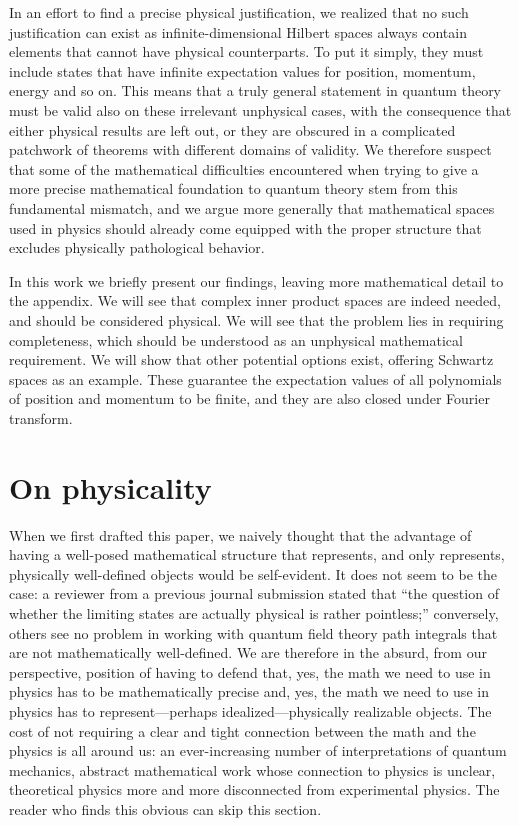 \documentclass[10pt,twocolumn, nofootinbib]{revtex4-2}
\begin{document}
In an effort to find a precise physical justification, we realized that no such justification can exist as infinite-dimensional Hilbert spaces always contain elements that cannot have physical counterparts. To put it simply, they must include states that have infinite expectation values for position, momentum, energy and so on. This means that a truly general statement in quantum theory must be valid also on these irrelevant unphysical cases, with the consequence that either physical results are left out, or they are obscured in a complicated patchwork of theorems with different domains of validity. We therefore suspect that some of the mathematical difficulties encountered when trying to give a more precise mathematical foundation to quantum theory stem from this fundamental mismatch, and we argue more generally that mathematical spaces used in physics should already come equipped with the proper structure that excludes physically pathological behavior.

In this work we briefly present our findings, leaving more mathematical detail to the appendix. We will see that complex inner product spaces are indeed needed, and should be considered physical. We will see that the problem lies in requiring completeness, which should be understood as an unphysical mathematical requirement. We will show that other potential options exist, offering Schwartz spaces as an example. These guarantee the expectation values of all polynomials of position and momentum to be finite, and they are also closed under Fourier transform.

\section{On physicality}

When we first drafted this paper, we naively thought that the advantage of having a well-posed mathematical structure that represents, and only represents, physically well-defined objects would be self-evident. It does not seem to be the case: a reviewer from a previous journal submission stated that ``the question of whether the limiting states are actually physical is rather pointless;'' conversely, others see no problem in working with quantum field theory path integrals that are not mathematically well-defined. We are therefore in the absurd, from our perspective, position of having to defend that, yes, the math we need to use in physics has to be mathematically precise and, yes, the math we need to use in physics has to represent---perhaps idealized---physically realizable objects. The cost of not requiring a clear and tight connection between the math and the physics is all around us: an ever-increasing number of interpretations of quantum mechanics, abstract mathematical work whose connection to physics is unclear, theoretical physics more and more disconnected from experimental physics. The reader who finds this obvious can skip this section.
\end{document}
